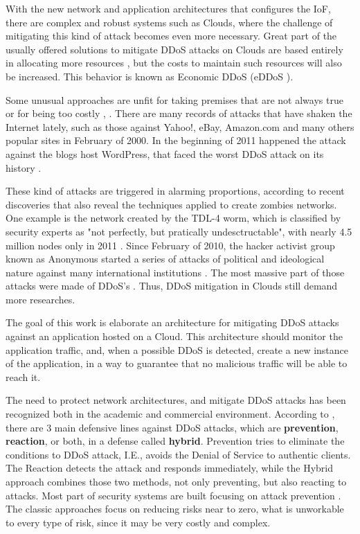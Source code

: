 With the new network and application architectures that configures the IoF, there are complex and robust systems such as Clouds, where the challenge of mitigating this kind of attack becomes even more necessary. Great part of the usually offered solutions to mitigate DDoS attacks on Clouds are based entirely in allocating more resources \cite{Peng:2007:SND:1216370.1216373}, but the costs to maintain such resources will also be increased. This behavior is known as Economic DDoS (eDDoS \cite{Soon:10}).

Some unusual approaches are unfit for taking premises that are not always true or for being too costly \cite{Bakshi:10}, \cite{Liu:2010:NFD:1866835.1866849}. There are many records of attacks that have shaken the Internet lately, such as those against Yahoo!, eBay, Amazon.com and many others popular sites in February of 2000. In the beginning of 2011 happened the attack against the blogs host WordPress, that faced the worst DDoS attack on its history \cite{infoexame}.

These kind of attacks are triggered in alarming proportions, according to recent discoveries that also reveal the techniques applied to create zombies networks. One example is the network created by the TDL-4 worm, which is classified by security experts as "not perfectly, but pratically undesctructable", with nearly 4.5 million nodes only in 2011 \cite{tdl4}. Since February of 2010, the hacker activist group known as Anonymous started a series of attacks of political and ideological nature against many international institutions \cite{titstorm}. The most massive part of those attacks were made of DDoS's \cite{infoexame}. Thus, DDoS mitigation in Clouds still demand more researches.

The goal of this work is elaborate an architecture for mitigating DDoS attacks against an application hosted on a Cloud. This architecture should monitor the application traffic, and, when a possible DDoS is detected, create a new instance of the application, in a way to guarantee that no malicious traffic will be able to reach it.

The need to protect network architectures, and mitigate DDoS attacks has been recognized both in the academic and commercial environment. According to \cite{1039856}, there are 3 main defensive lines against DDoS attacks, which are \textbf{prevention}, \textbf{reaction}, or both, in a defense called \textbf{hybrid}. Prevention tries to eliminate the conditions to DDoS attack, I.E., avoids the Denial of Service to authentic clients. The Reaction detects the attack and responds immediately, while the Hybrid approach combines those two methods, not only preventing, but also reacting to attacks. Most part of security systems are built focusing on attack prevention \cite{4429182}. The classic approaches focus on reducing risks near to zero, what is unworkable to every type of risk, since it may be very costly and complex.

